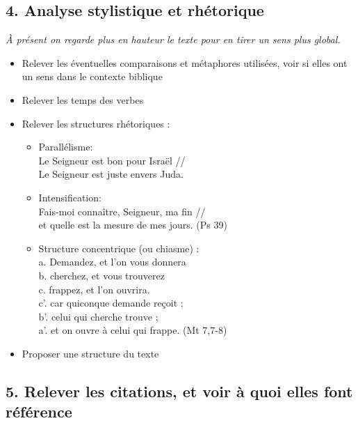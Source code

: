 \documentclass[12pt,a4paper,titlepage]{article}
\begin{document}
\subsection*{4. Analyse stylistique et rhétorique}
\emph{À présent on regarde plus en hauteur le texte pour en tirer un sens plus global.}
\begin{itemize}[label=]
\item Relever les éventuelles comparaisons et métaphores utilisées, voir si elles ont un sens dans le contexte biblique
\item Relever les temps des verbes
\item Relever les structures rhétoriques :
\begin{itemize}[label=]
\item Parallélisme:\\
\decalage Le Seigneur est bon pour Israël // \\
\decalage Le Seigneur est juste envers Juda.
\item Intensification:\\
\decalage Fais-moi connaître, Seigneur, ma fin // \\
\decalage et quelle est la mesure de mes jours. (Ps 39)
\item Structure concentrique (ou chiasme) :\\
\decalage a. Demandez, et l’on vous donnera\\
\decalage \decalage b. cherchez, et vous trouverez\\
\decalage \decalage \decalage c. frappez, et l’on ouvrira.\\
\decalage \decalage \decalage c’. car quiconque demande reçoit ;\\
\decalage \decalage b’. celui qui cherche trouve ;\\
\decalage a’. et on ouvre à celui qui frappe. (Mt 7,7-8)
\end{itemize}
\item Proposer une structure du texte
\end{itemize}
\subsection*{5. Relever les citations, et voir à quoi elles font référence}
\end{document}
